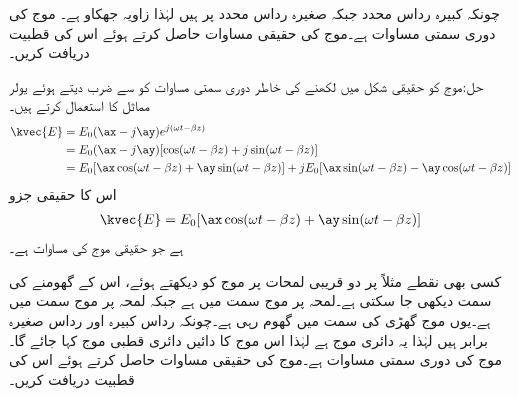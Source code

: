 چونکہ کبیرہ رداس  محدد جبکہ صغیرہ رداس  محدد پر ہیں لہٰذا زاویہ جھکاو  ہے۔ 
موج کی دوری سمتی مساوات  ہے۔موج کی حقیقی مساوات حاصل کرتے ہوئے اس کی قطبیت دریافت کریں۔

حل:موج کو حقیقی شکل میں لکھنے کی خاطر دوری سمتی مساوات کو  سے ضرب دیتے ہوئے  یولر مماثل کا استعمال کرتے ہیں۔
\begin{align*}
\kvec{E}&=E_0(\ax-j\ay)e^{j(\omega t -\beta z)}\\
&=E_0(\ax-j\ay)[\cos(\omega t -\beta z)+j \sin(\omega t -\beta z)]\\
&=E_0 [\ax \cos (\omega t -\beta z)+\ay \sin(\omega t -\beta z)]+j E_0[\ax \sin(\omega t -\beta z)-\ay \cos(\omega t -\beta z)]
\end{align*}
اس کا حقیقی جزو 
\begin{align*}
\kvec{E}=E_0 [\ax \cos (\omega t -\beta z)+\ay \sin(\omega t -\beta z)]
\end{align*}
ہے جو حقیقی موج کی مساوات ہے۔

کسی بھی نقطے مثلاً  پر دو قریبی لمحات پر موج کو دیکھتے ہوئے، اس کے گھومنے کی سمت دیکھی جا سکتی ہے۔لمحہ  پر موج  سمت میں ہے جبکہ لمحہ  پر موج  سمت میں ہے۔یوں موج گھڑی کی سمت میں گھوم رہی ہے۔چونکہ رداس کبیرہ اور رداس صغیرہ برابر ہیں لہٰذا یہ دائری موج ہے لہٰذا اس موج کا دائیں دائری قطبی موج کہا جائے گا۔
موج کی دوری سمتی مساوات  ہے۔موج کی حقیقی مساوات حاصل کرتے ہوئے اس کی قطبیت دریافت کریں۔

